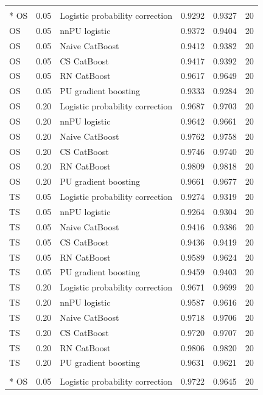 \begin{longtable}{@{}p{0.65in}rp{2.85in}rrr@{}}
\addlinespace[2pt]
\multicolumn{6}{l}{\textbf{Phishing Websites}}\\*
OS & 0.05 & Logistic probability correction & 0.9292 & 0.9327 & 20 \\
OS & 0.05 & nnPU logistic & 0.9372 & 0.9404 & 20 \\
OS & 0.05 & Naive CatBoost & 0.9412 & 0.9382 & 20 \\
OS & 0.05 & CS CatBoost & 0.9417 & 0.9392 & 20 \\
OS & 0.05 & RN CatBoost & 0.9617 & 0.9649 & 20 \\
OS & 0.05 & PU gradient boosting & 0.9333 & 0.9284 & 20 \\
\addlinespace[2pt]
OS & 0.20 & Logistic probability correction & 0.9687 & 0.9703 & 20 \\
OS & 0.20 & nnPU logistic & 0.9642 & 0.9661 & 20 \\
OS & 0.20 & Naive CatBoost & 0.9762 & 0.9758 & 20 \\
OS & 0.20 & CS CatBoost & 0.9746 & 0.9740 & 20 \\
OS & 0.20 & RN CatBoost & 0.9809 & 0.9818 & 20 \\
OS & 0.20 & PU gradient boosting & 0.9661 & 0.9677 & 20 \\
\addlinespace[2pt]
TS & 0.05 & Logistic probability correction & 0.9274 & 0.9319 & 20 \\
TS & 0.05 & nnPU logistic & 0.9264 & 0.9304 & 20 \\
TS & 0.05 & Naive CatBoost & 0.9416 & 0.9386 & 20 \\
TS & 0.05 & CS CatBoost & 0.9436 & 0.9419 & 20 \\
TS & 0.05 & RN CatBoost & 0.9589 & 0.9624 & 20 \\
TS & 0.05 & PU gradient boosting & 0.9459 & 0.9403 & 20 \\
\addlinespace[2pt]
TS & 0.20 & Logistic probability correction & 0.9671 & 0.9699 & 20 \\
TS & 0.20 & nnPU logistic & 0.9587 & 0.9616 & 20 \\
TS & 0.20 & Naive CatBoost & 0.9718 & 0.9706 & 20 \\
TS & 0.20 & CS CatBoost & 0.9720 & 0.9707 & 20 \\
TS & 0.20 & RN CatBoost & 0.9806 & 0.9820 & 20 \\
TS & 0.20 & PU gradient boosting & 0.9631 & 0.9621 & 20 \\
\addlinespace[2pt]
\pagebreak
\multicolumn{6}{l}{\textbf{Rice}}\\*
OS & 0.05 & Logistic probability correction & 0.9722 & 0.9645 & 20 \\

\end{longtable}
